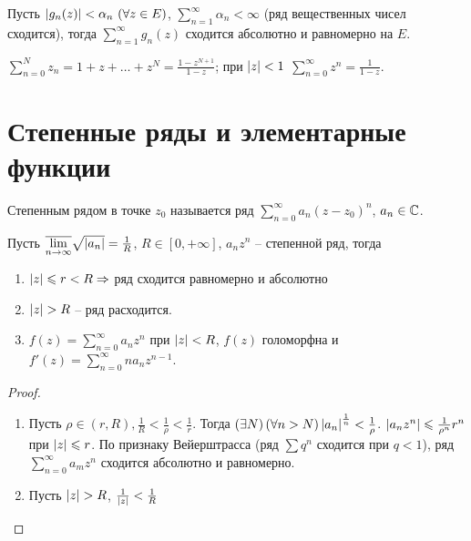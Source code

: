 \begin{theorem}
	Пусть $\mathopen{}\left\lvert g_n(z)\right\rvert\mathclose{} < \alpha_n \,\, (\forall z \in E)$, $\sum_{n = 1}^\infty \alpha_n < \infty$ (ряд вещественных чисел сходится), тогда $\sum_{n = 1}^\infty g_n(z)$ сходится абсолютно и равномерно на $E$.
\end{theorem}

\begin{proposition}
	$\sum_{n = 0}^N z_n = 1 + z + \ldots + z^N = \frac{1 - z^{N + 1}}{1 - z}$; при $\mathopen{}\left\lvert z\right\rvert\mathclose{} < 1$ $\sum_{n = 0}^\infty z^n = \frac{1}{1 - z}$. %
\end{proposition}

\section{Степенные ряды и элементарные функции}

\begin{definition}
	Степенным рядом в точке $z_0$ называется ряд $\sum_{n = 0}^\infty a_n {(z - z_0)}^n$, $a_n \in \mathbb{C}$.
\end{definition}

\begin{theorem}
	Пусть $\overline{\lim\limits_{n \to \infty}} \sqrt{\mathopen{}\left\lvert a_n\right\rvert\mathclose{}} = \frac{1}{R}$, $R \in [0, +\infty]$, $a_n z^n$ -- степенной ряд, тогда
	\begin{enumerate}
		\item $\mathopen{}\left\lvert z\right\rvert\mathclose{} \leqslant r < R \Rightarrow$ ряд сходится равномерно и абсолютно %
		\item $\mathopen{}\left\lvert z\right\rvert\mathclose{} > R$ -- ряд расходится.
		\item $f(z) = \sum_{n = 0}^\infty a_n z^n$ при $\mathopen{}\left\lvert z\right\rvert\mathclose{} < R$, $f(z)$ голоморфна и $f'(z) = \sum_{n = 0}^\infty n a_n z^{n - 1}$.
	\end{enumerate}
\end{theorem}

\begin{proof}
	\begin{enumerate}
		\item Пусть $\rho \in (r, R), \frac{1}{R} < \frac{1}{\rho} < \frac{1}{r}$. Тогда $(\exists N) \, (\forall n > N) \, {\mathopen{}\left\lvert a_n\right\rvert\mathclose{}}^{\frac{1}{n}} < \frac{1}{\rho}$. $\mathopen{}\left\lvert a_n z^n\right\rvert\mathclose{} \leqslant \frac{1}{\rho^n} r^n$ при $\mathopen{}\left\lvert z\right\rvert\mathclose{} \leqslant r$. По признаку Вейерштрасса (ряд $\sum q^n$ сходится при $q < 1$), ряд $\sum_{n = 0}^\infty a_m z^n$ сходится абсолютно и равномерно. %
		\item Пусть $\mathopen{}\left\lvert z\right\rvert\mathclose{} > R$, $\frac{1}{\mathopen{}\left\lvert z\right\rvert\mathclose{}} < \frac{1}{R}$
	\end{enumerate}
\end{proof}
